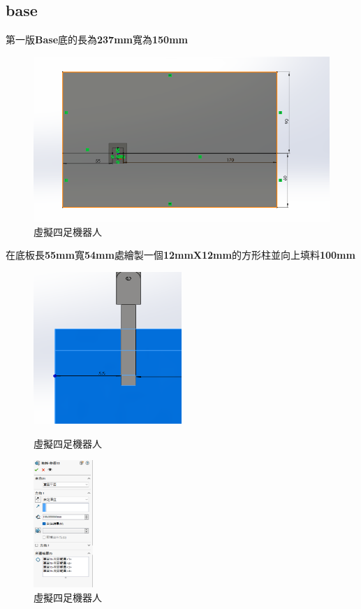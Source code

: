 \subsection{base}
第一版\textbf{Base}底的長為\textbf{237mm}寬為\textbf{150mm}

\begin{figure}[h!]
    \centering
    \includegraphics[width=1\textwidth]{./../images/6-1-27.png}
    \caption{\Large 虛擬四足機器人}
\end{figure}

\noindent 在底板長\textbf{55mm}寬\textbf{54mm}處繪製一個\textbf{12mmX12mm}的方形柱並向上填料\textbf{100mm}

\begin{figure}[h!]
    \centering
    \includegraphics[width=0.5\textwidth]{./../images/6-1-28.png}
    \caption{\Large 虛擬四足機器人}
    \includegraphics[width=0.2\textwidth]{./../images/6-1-29.png}
    \caption{\Large 虛擬四足機器人}
\end{figure}

